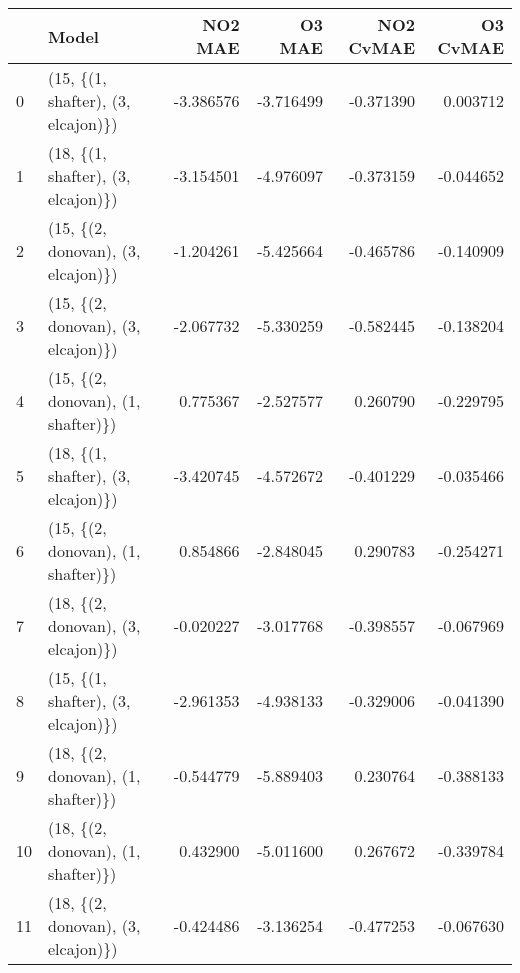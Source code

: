 \begin{tabular}{llrrrr}
\toprule
{} &                               Model &   NO2 MAE &    O3 MAE &  NO2 CvMAE &  O3 CvMAE \\
\midrule
0  &  (15, \{(1, shafter), (3, elcajon)\}) & -3.386576 & -3.716499 &  -0.371390 &  0.003712 \\
1  &  (18, \{(1, shafter), (3, elcajon)\}) & -3.154501 & -4.976097 &  -0.373159 & -0.044652 \\
2  &  (15, \{(2, donovan), (3, elcajon)\}) & -1.204261 & -5.425664 &  -0.465786 & -0.140909 \\
3  &  (15, \{(2, donovan), (3, elcajon)\}) & -2.067732 & -5.330259 &  -0.582445 & -0.138204 \\
4  &  (15, \{(2, donovan), (1, shafter)\}) &  0.775367 & -2.527577 &   0.260790 & -0.229795 \\
5  &  (18, \{(1, shafter), (3, elcajon)\}) & -3.420745 & -4.572672 &  -0.401229 & -0.035466 \\
6  &  (15, \{(2, donovan), (1, shafter)\}) &  0.854866 & -2.848045 &   0.290783 & -0.254271 \\
7  &  (18, \{(2, donovan), (3, elcajon)\}) & -0.020227 & -3.017768 &  -0.398557 & -0.067969 \\
8  &  (15, \{(1, shafter), (3, elcajon)\}) & -2.961353 & -4.938133 &  -0.329006 & -0.041390 \\
9  &  (18, \{(2, donovan), (1, shafter)\}) & -0.544779 & -5.889403 &   0.230764 & -0.388133 \\
10 &  (18, \{(2, donovan), (1, shafter)\}) &  0.432900 & -5.011600 &   0.267672 & -0.339784 \\
11 &  (18, \{(2, donovan), (3, elcajon)\}) & -0.424486 & -3.136254 &  -0.477253 & -0.067630 \\
\bottomrule
\end{tabular}
